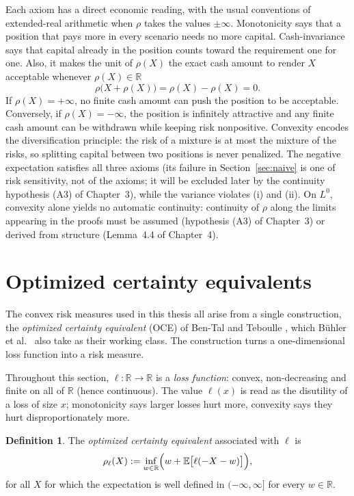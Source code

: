 \documentclass[11pt,a4paper]{report}
\numberwithin{equation}{chapter}
\theoremstyle{plain}
\theoremstyle{definition}
\newtheorem{definition}[proposition]{Definition}
\newcommand{\E}{\mathbb{E}}
\newcommand{\R}{\mathbb{R}}
\begin{document}
Each axiom has a direct economic reading, with the usual conventions of extended-real arithmetic when $\rho$ takes the values $\pm\infty$. Monotonicity says that a position that pays more in every scenario needs no more capital. Cash-invariance says that capital already in the position counts toward the requirement one for one. Also, it makes the unit of $\rho(X)$ the exact cash amount to render $X$ acceptable whenever $\rho(X)\in\R$
\[
    \rho\bigl(X+\rho(X)\bigr)=\rho(X)-\rho(X)=0.
\]
If $\rho(X)=+\infty$, no finite cash amount can push the position to be acceptable. Conversely, if $\rho(X)=-\infty$, the position is infinitely attractive and any finite cash amount can be withdrawn while keeping risk nonpositive. Convexity encodes the diversification principle: the risk of a mixture is at most the mixture of the risks, so splitting capital between two positions is never penalized. The negative expectation satisfies all three axioms (its failure in Section~\ref{sec:naive} is one of risk sensitivity, not of the axioms; it will be excluded later by the continuity hypothesis (A3) of Chapter~3), while the variance violates (i) and (ii). On $L^0$, convexity alone yields no automatic continuity: continuity of $\rho$ along the limits appearing in the proofs must be assumed (hypothesis (A3) of Chapter~3) or derived from structure (Lemma~4.4 of Chapter~4). %

\section{Optimized certainty equivalents}\label{sec:oce}

The convex risk measures used in this thesis all arise from a single construction, the \emph{optimized certainty equivalent} (OCE) of Ben-Tal and Teboulle \cite{bentalteboulle}, which B\"uhler et al.\ \cite[Section~3.3]{buehler} also take as their working class. The construction turns a one-dimensional loss function into a risk measure.

Throughout this section, $\ell\colon\R\to\R$ is a \emph{loss function}: convex, non-decreasing and finite on all of $\R$ (hence continuous). The value $\ell(x)$ is read as the disutility of a loss of size $x$; monotonicity says larger losses hurt more, convexity says they hurt disproportionately more.

\begin{definition}\label{def:oce}
    The \emph{optimized certainty equivalent} associated with $\ell$ is
    \begin{equation}\label{eq:OCE}
        \rho_\ell(X):=\inf_{w\in\R}\Bigl(w+\E\bigl[\ell(-X-w)\bigr]\Bigr),
    \end{equation}
    for all $X$ for which the expectation is well defined in $(-\infty,\infty]$ for every $w\in\R$.
\end{definition}
\end{document}
